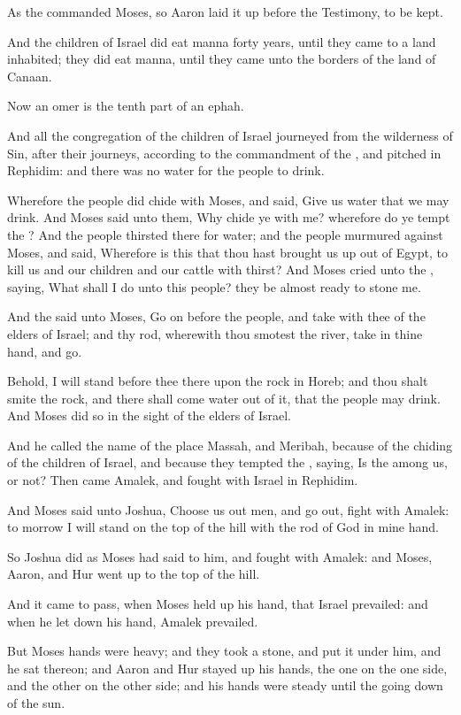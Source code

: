 \Verse As the \LORD commanded Moses, so Aaron laid it up before the Testimony, to be kept.

\Verse And the children of Israel did eat manna forty years, until they came to a land inhabited; they did eat manna, until they came unto the borders of the land of Canaan.

\Verse Now an omer is the tenth part of an ephah.

\Chapter
\Verse And all the congregation of the children of Israel journeyed from the wilderness of Sin, after their journeys, according to the commandment of the \LORD, and pitched in Rephidim: and there was no water for the people to drink.

\Verse Wherefore the people did chide with Moses, and said, Give us water that we may drink. And Moses said unto them, Why chide ye with me? wherefore do ye tempt the \LORD?  \Verse And the people thirsted there for water; and the people murmured against Moses, and said, Wherefore is this that thou hast brought us up out of Egypt, to kill us and our children and our cattle with thirst?  \Verse And Moses cried unto the \LORD, saying, What shall I do unto this people? they be almost ready to stone me.

\Verse And the \LORD said unto Moses, Go on before the people, and take with thee of the elders of Israel; and thy rod, wherewith thou smotest the river, take in thine hand, and go.

\Verse Behold, I will stand before thee there upon the rock in Horeb; and thou shalt smite the rock, and there shall come water out of it, that the people may drink. And Moses did so in the sight of the elders of Israel.

\Verse And he called the name of the place Massah, and Meribah, because of the chiding of the children of Israel, and because they tempted the \LORD, saying, Is the \LORD among us, or not?  \Verse Then came Amalek, and fought with Israel in Rephidim.

\Verse And Moses said unto Joshua, Choose us out men, and go out, fight with Amalek: to morrow I will stand on the top of the hill with the rod of God in mine hand.

\Verse So Joshua did as Moses had said to him, and fought with Amalek: and Moses, Aaron, and Hur went up to the top of the hill.

\Verse And it came to pass, when Moses held up his hand, that Israel prevailed: and when he let down his hand, Amalek prevailed.

\Verse But Moses hands were heavy; and they took a stone, and put it under him, and he sat thereon; and Aaron and Hur stayed up his hands, the one on the one side, and the other on the other side; and his hands were steady until the going down of the sun.

